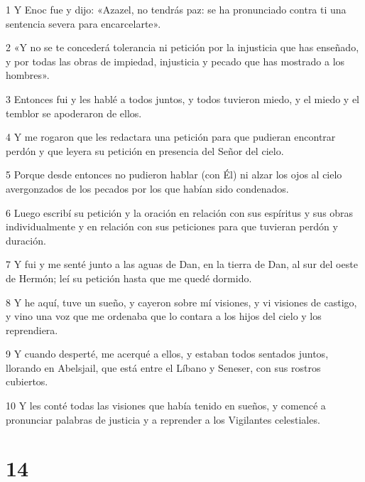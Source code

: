 \par 1 Y Enoc fue y dijo: «Azazel, no tendrás paz: se ha pronunciado contra ti una sentencia severa para encarcelarte».
\par 2 «Y no se te concederá tolerancia ni petición por la injusticia que has enseñado, y por todas las obras de impiedad, injusticia y pecado que has mostrado a los hombres».
\par 3 Entonces fui y les hablé a todos juntos, y todos tuvieron miedo, y el miedo y el temblor se apoderaron de ellos.
\par 4 Y me rogaron que les redactara una petición para que pudieran encontrar perdón y que leyera su petición en presencia del Señor del cielo.
\par 5 Porque desde entonces no pudieron hablar (con Él) ni alzar los ojos al cielo avergonzados de los pecados por los que habían sido condenados.
\par 6 Luego escribí su petición y la oración en relación con sus espíritus y sus obras individualmente y en relación con sus peticiones para que tuvieran perdón y duración.
\par 7 Y fui y me senté junto a las aguas de Dan, en la tierra de Dan, al sur del oeste de Hermón; leí su petición hasta que me quedé dormido.
\par 8 Y he aquí, tuve un sueño, y cayeron sobre mí visiones, y vi visiones de castigo, y vino una voz que me ordenaba que lo contara a los hijos del cielo y los reprendiera.
\par 9 Y cuando desperté, me acerqué a ellos, y estaban todos sentados juntos, llorando en Abelsjail, que está entre el Líbano y Seneser, con sus rostros cubiertos.
\par 10 Y les conté todas las visiones que había tenido en sueños, y comencé a pronunciar palabras de justicia y a reprender a los Vigilantes celestiales.

\chapter{14}

